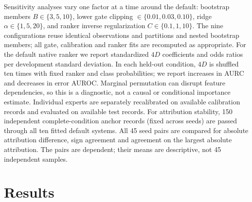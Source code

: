 \documentclass[conference]{IEEEtran}
\begin{document}
Sensitivity analyses vary one factor at a time around the default: bootstrap members $B\in\{3,5,10\}$, lower gate clipping $\in\{0.01,0.03,0.10\}$, ridge $\alpha\in\{1,5,20\}$, and ranker inverse regularization $C\in\{0.1,1,10\}$. The nine configurations reuse identical observations and partitions and nested bootstrap members; all gate, calibration and ranker fits are recomputed as appropriate. For the default native ranker we report standardized $4D$ coefficients and odds ratios per development standard deviation. In each held-out condition, $4D$ is shuffled ten times with fixed ranker and class probabilities; we report increases in AURC and decreases in error AUROC. Marginal permutation can disrupt feature dependencies, so this is a diagnostic, not a causal or conditional importance estimate. Individual experts are separately recalibrated on available calibration records and evaluated on available test records. For attribution stability, 150 independent complete-condition anchor records (fixed across seeds) are passed through all ten fitted default systems. All 45 seed pairs are compared for absolute attribution difference, sign agreement and agreement on the largest absolute attribution. The pairs are dependent; their means are descriptive, not 45 independent samples.
\section{Results}
\end{document}
